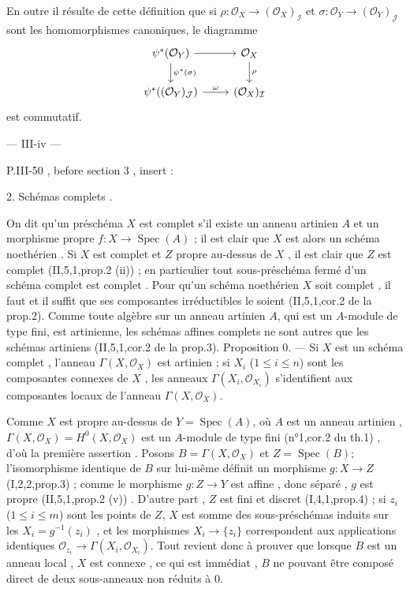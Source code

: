 En outre il résulte de cette définition que si $\rho : \mathcal{O}_X \to (\mathcal{O}_X)_{\mathcal{I}}$ et $\sigma : \mathcal{O}_Y \to (\mathcal{O}_Y)_{\mathcal{J}}$ sont les homomorphismes canoniques, le diagramme
$$\begin{tikzcd}
\psi^*(\mathcal{O}_Y) \arrow[d, "\psi^*(\sigma)"] \arrow[r] & \mathcal{O}_X \arrow[d, "\rho"] \\
\psi^*((\mathcal{O}_Y)_{\mathcal{J}}) \arrow[r, "\omega"] & (\mathcal{O}_X)_{\mathcal{I}}
\end{tikzcd}$$
est commutatif.

\newpage


\noindent --- III-iv ---

P.III-50 , before section 3 , insert :

2. Schémas complets .

On dit qu'un préschéma $X$ est complet s'il existe un anneau artinien $A$ et un morphisme propre $f : X \to \operatorname{Spec}(A)$ ; il est clair que $X$ est alors un schéma noethérien . Si $X$ est complet et $Z$ propre au-dessus de $X$ , il est clair que $Z$ est complet (II,5,1,prop.2 (ii)) ; en particulier tout sous-préschéma fermé d'un schéma complet est complet . Pour qu'un schéma noethérien $X$ soit complet , il faut et il suffit que ses composantes irréductibles le soient (II,5,1,cor.2 de la prop.2). Comme toute algèbre sur un anneau artinien $A$, qui est un $A$-module de type fini, est artinienne, les schémas affines complets ne sont autres que les schémas artiniens (II,5,1,cor.2 de la prop.3). Proposition 0. — Si $X$ est un schéma complet , l'anneau $\Gamma(X,\mathcal{O}_X)$ est artinien ; si $X_i$ ($1 \le i \le n$) sont les composantes connexes de $X$ , les anneaux $\Gamma(X_i, \mathcal{O}_{X_i})$ s'identifient aux composantes locaux de l'anneau $\Gamma(X, \mathcal{O}_X)$.

Comme $X$ est propre au-dessus de $Y=\operatorname{Spec}(A)$, où $A$ est un anneau artinien , $\Gamma(X, \mathcal{O}_X) = H^0(X, \mathcal{O}_X)$ est un $A$-module de type fini (n°1,cor.2 du th.1) , d'où la première assertion . Posons $B = \Gamma(X, \mathcal{O}_X)$ et $Z=\operatorname{Spec}(B)$; l'isomorphisme identique de $B$ sur lui-même définit un morphisme $g : X \to Z$ (I,2,2,prop.3) ; comme le morphisme $g : Z \to Y$ est affine , donc séparé , $g$ est propre (II,5,1,prop.2 (v)) . D'autre part , $Z$ est fini et discret (I,4,1,prop.4) ; si $z_i$ ($1 \le i \le m$) sont les points de $Z$, $X$ est somme des sous-préschémas induits sur les $X_i = g^{-1}(z_i)$ , et les morphismes $X_i \to \{z_i\}$ correspondent aux applications identiques $\mathcal{O}_{z_i} \to \Gamma(X_i, \mathcal{O}_{X_i})$. Tout revient donc à prouver que lorsque $B$ est un anneau local , $X$ est connexe , ce qui est immédiat , $B$ ne pouvant être composé direct de deux sous-anneaux non réduits à $0$.

